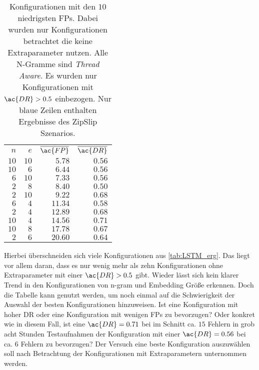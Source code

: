     \begin{table}[ht]
        \centering
        \begin{tabular}{rrrr}
            \hline
            \rowcolor{GruvGray!36}
            \multicolumn{4}{c}{Ohne Extraparameter, nach \ac{FP}}\\
            \toprule
            $n$ & $e$ & $\overline{\ac{FP}}$ & $\overline{\ac{DR}}$ \\
            \midrule
            \rowcolor{GruvGray!16}
            $10$ & 	$10$ & 	$5.78$ & 	    $0.56$ \\
            $10$ & 	$6$ & 	$6.44$ & 	    $0.56$ \\
            \rowcolor{GruvGray!16}
            $6$ & 	$10$ & 	$7.33$ & 	    $0.56$ \\
            \rowcolor{CTblue!16}
            $2$ & 	$8$ & 	$8.40$ & 	    $0.50$ \\
            \rowcolor{GruvGray!16}
            $2$ & 	$10$ & 	$9.22$ & 	    $0.68$ \\
            $6$ & 	$4$ & 	$11.34$ & 	$0.58$ \\
            \rowcolor{GruvGray!16}
            $2$ & 	$4$ & 	$12.89$ & 	$0.68$ \\
            $10$ & 	$4$ & 	$14.56$ & 	$0.71$ \\
            \rowcolor{GruvGray!16}
            $10$ & 	$8$ & 	$17.78$ & 	$0.67$ \\
            \rowcolor{CTblue!16}
            $2$ & 	$6$ & 	$20.60$ & 	$0.64$ \\
            \hline
        \end{tabular}
        \caption[Ergebnisse \ac{FP}-Rate ohne Extraparameter]{Konfigurationen mit den $10$ niedrigsten \acp{FP}. 
                 Dabei wurden nur Konfigurationen betrachtet die keine Extraparameter nutzen.
                 Alle N-Gramme sind \textit{Thread Aware}.
                 Es wurden nur Konfigurationen mit $\ac{DR}>0.5$ einbezogen.
                 Nur blaue Zeilen enthalten Ergebnisse des ZipSlip Szenarios.}
        \label{tab:LSTM_erg_FP}
    \end{table}
    
    Hierbei überschneiden sich viele Konfigurationen aus \autoref{tab:LSTM_erg}.
    Das liegt vor allem daran, dass es nur wenig mehr als zehn Konfigurationen ohne Extraparameter mit einer $\ac{DR}>0.5$ gibt.
    Wieder lässt sich kein klarer Trend in den Konfigurationen von n-gram und Embedding Größe erkennen.
    Doch die Tabelle kann genutzt werden, um noch einmal auf die Schwierigkeit der Auswahl der besten Konfigurationen hinzuweisen.
    Ist eine Konfiguration mit hoher \ac{DR} oder eine Konfiguration mit wenigen \acp{FP} zu bevorzugen?
    Oder konkret wie in diesem Fall, ist eine $\ac{DR}=0.71$ bei im Schnitt ca. $15$ Fehlern in grob acht Stunden Testaufnahmen der Konfiguration mit einer $\ac{DR}=0.56$ bei ca. $6$ Fehlern zu bevorzugen?
    Der Versuch eine beste Konfiguration auszuwählen soll nach Betrachtung der Konfigurationen mit Extraparametern unternommen werden.

